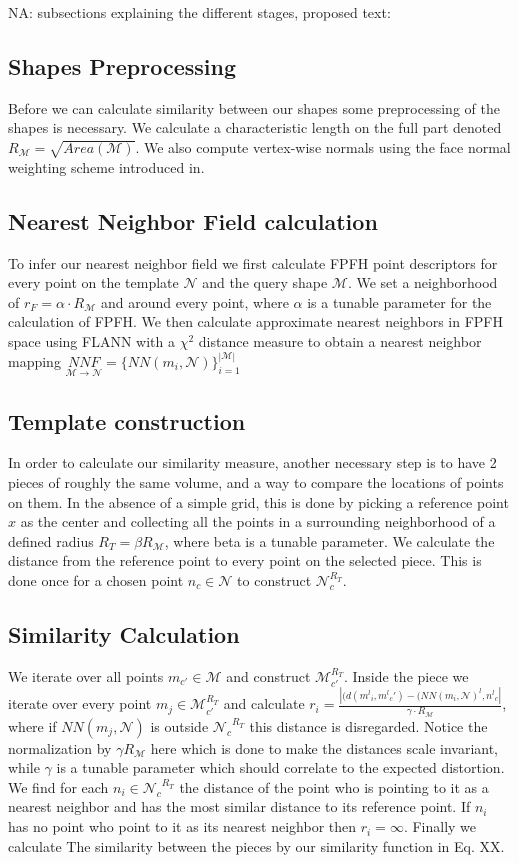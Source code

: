 \documentclass[10pt,twocolumn,letterpaper]{article}
\newcommand{\colornote}[3]{{\color{#1}\bf{#2: #3}\normalfont}}
\newcommand{\colornote}[3]{}
\newcommand {\nadav}[1]{\colornote{red}{NA}{#1}}
\begin{document}
\nadav{subsections explaining the different stages, proposed text: 
\subsection{Shapes Preprocessing}
Before we can calculate similarity between our shapes some preprocessing of the shapes is necessary. 
We calculate a characteristic length on the full part denoted $R_\mathcal{M}=\sqrt{Area(\mathcal{M})}$. We also compute vertex-wise normals using the face normal weighting scheme introduced in\cite{max1999weights}. 
\subsection{Nearest Neighbor Field calculation}
To infer our nearest neighbor field we first calculate FPFH\cite{rusu2009fast} point descriptors for every point on the template $\mathcal{N}$ and the query shape $\mathcal{M}$. We set a neighborhood of $r_F=\alpha\cdot R_\mathcal{M}$ and around every point, where $\alpha$ is a tunable parameter for the calculation of FPFH. We then calculate approximate nearest neighbors in FPFH space using FLANN with a $\chi^2$ distance measure to obtain a nearest neighbor mapping $\underset{\mathcal{M}\rightarrow\mathcal{N}}{NNF}=\{NN(m_i,\mathcal{N})\}_{i=1}^{|\mathcal{M}|}$
\subsection{Template construction}
In order to calculate our similarity measure, another necessary step is to have 2 pieces of roughly the same volume, and a way to compare the locations of points on them. In the absence of a simple grid, this is done by picking a reference point $x$ as the center and collecting all the points in a surrounding neighborhood of a defined radius $R_T=\beta R_\mathcal{M}$, where beta is a tunable parameter. We calculate the distance from the reference point to every point on the selected piece. This is done once for a chosen point $n_c\in\mathcal{N}$ to construct $\mathcal{N}^{R_T}_{c}$.
\subsection{Similarity Calculation}
We iterate over all points $m_{c'}\in\mathcal{M}$ and construct ${\mathcal{M}^{R_T}_{c'}}$. Inside the piece we iterate over every point $m_j\in{\mathcal{M}^{R_T}_{c'}}$ and calculate $r_i=\frac{|(d({m^l}_i,{m^l}_c')-(NN(m_i,\mathcal{N})^l,{n^l}_c|}{\gamma\cdot R_\mathcal{M}}$, where if $NN(m_j,\mathcal{N})$ is outside ${\mathcal{N}_c}^{R_T}$ this distance is disregarded. Notice the normalization by $\gamma R_\mathcal{M}$ here which is done to make the distances scale invariant, while $\gamma$ is a tunable parameter which should correlate to the expected distortion. We find for each $n_i\in{\mathcal{N}_c}^{R_T}$ the distance of the point who is pointing to it as a nearest neighbor and has the most similar distance to its reference point. If $n_i$ has no point who point to it as its nearest neighbor then $r_i=\infty$. Finally we calculate The similarity between the pieces by our similarity function in Eq. XX.
}
\end{document}
